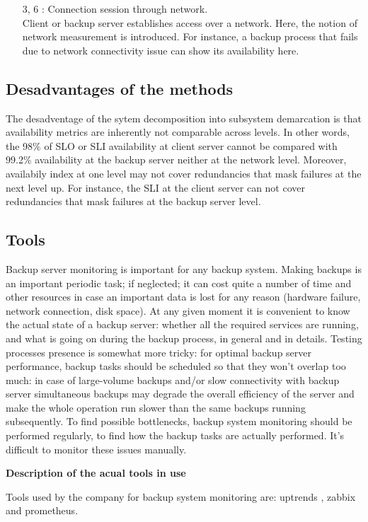 \documentclass[english]{tktltiki2}
\theoremstyle{definition}
\theoremstyle{remark}
\begin{document}
\begin{itemize}
\item[3, 6]: Connection session through network.\\
Client or backup server establishes access over a network. Here, the notion of network measurement is introduced. For instance, a backup process that fails due to network connectivity issue can show its availability  here.
\end{itemize}


\subsection{Desadvantages of the methods}
 The desadventage of the sytem decomposition into subsystem demarcation is that availability metrics are inherently not comparable across levels. In other words, the  98\% of SLO or SLI availability at client server cannot
be compared with 99.2\% availability at the backup server neither at the network level. Moreover, availabily index at one level may not cover redundancies that mask failures at the next level up. For instance, the SLI at the client server can not cover redundancies that mask failures at the backup server level.
\subsection{Tools}
Backup server monitoring is important for any backup system. Making backups is an important periodic task; if neglected; it can cost quite a number of time and other resources in case an important data is lost for any reason (hardware failure, network connection, disk space). At any given moment it is convenient to know the actual state of a backup server: whether all the required services are running, and what is going on during the backup process, in general and in details.
Testing processes presence is somewhat more tricky: for optimal backup server performance, backup tasks should be scheduled so that they won’t overlap too much: in case of large-volume backups and/or slow connectivity with backup server simultaneous backups may degrade the overall efficiency of the server and make the whole operation run slower than the same backups running subsequently. To find possible bottlenecks, backup system monitoring should be performed regularly, to find how the backup tasks are actually performed. It’s difficult to monitor these issues manually.

\begin{flushleft}
\textbf{Description of the acual tools in use}
\end{flushleft}
Tools used  by the company for backup system monitoring are:  uptrends \cite{Uptrends}, zabbix and prometheus.
\end{document}
